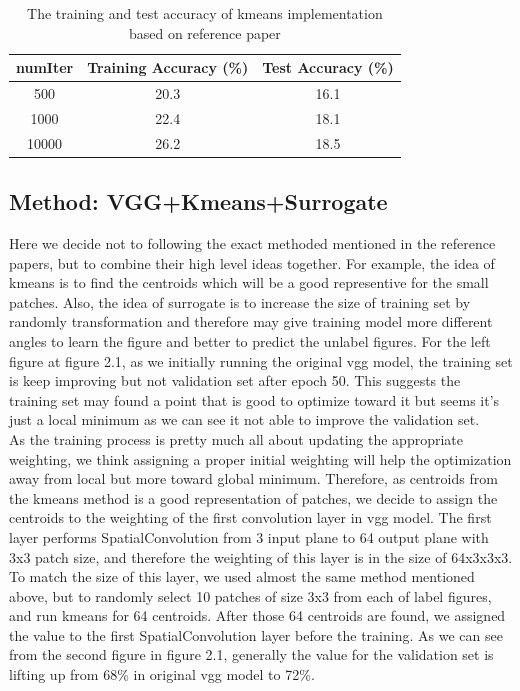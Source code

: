 \documentclass[final]{siamltexmm}
\begin{document}
\begin{table}[H]
\begin{center}
    \begin{tabular}{| c | c | c |}
    \hline
    numIter & Training Accuracy (\%) & Test Accuracy (\%) \\ \hline
    500 & 20.3 & 16.1 \\ \hline
    1000 & 22.4 & 18.1 \\ \hline
    10000 & 26.2 & 18.5 \\ \hline
    \end{tabular}
\end{center}
\caption{The training and test accuracy of kmeans implementation based on reference paper}
\end{table}

\subsection{Method: VGG+Kmeans+Surrogate}
Here we decide not to following the exact methoded mentioned in the reference papers, but to combine their high level ideas together. For example, the idea of kmeans is to find the centroids which will be a good representive for the small patches. Also, the idea of surrogate is to increase the size of training set by randomly transformation and therefore may give training model more different angles to learn the figure and better to predict the unlabel figures. For the left figure at figure 2.1, as we initially running the original vgg model, the training set is keep improving but not validation set after epoch 50. This suggests the training set may found a point that is good to optimize toward it but seems it's just a local minimum as we can see it not able to improve the validation set. \\
As the training process is pretty much all about updating the appropriate weighting, we think assigning a proper initial weighting will help the optimization away from local but more toward global minimum. Therefore, as centroids from the kmeans method is a good representation of patches, we decide to assign the centroids to the weighting of the first convolution layer in vgg model. The first layer performs SpatialConvolution from 3 input plane to 64 output plane with 3x3 patch size, and therefore the weighting of this layer is in the size of 64x3x3x3. To match the size of this layer, we used almost the same method mentioned above, but to randomly select 10 patches of size 3x3 from each of label figures, and run kmeans for 64 centroids. After those 64 centroids are found, we assigned the value to the first SpatialConvolution layer before the training. As we can see from the second figure in figure 2.1, generally the value for the validation set is lifting up from 68\% in original vgg model to 72\%.\\
\end{document}
